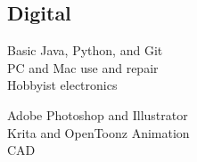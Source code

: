 \documentclass[a4paper]{deedy-resume} %
\begin{document}
    \begin{minipage}[t]{0.29\textwidth}
    
        \subsection{Digital}
        
            \textbullet{} Basic Java, Python, and Git \\
            \textbullet{} PC and Mac use and repair \\
            \textbullet{} Hobbyist electronics

            \textbullet{} Adobe Photoshop and Illustrator \\
            \textbullet{} Krita and OpenToonz Animation \\
            \textbullet{} CAD \\
        
    
    \end{minipage}

    
    \iffalse
    \begin{minipage}[t]{0.33\textwidth}
    \subsection{Outdoor}
    
    \location{Rock Climbing}
        \textbullet{} Rock Wall Employee lead 5.08 \\
        \textbullet{} Top rope 5.10\\
    
    \location{Backpacking}
        \textbullet{} 15+ yrs backcountry experience \\
        \textbullet{} Wilderness First Responder\\
    \location{Water Activities}
        \textbullet{} Lifeguard \\
        \textbullet{} Capable Sailor \\
        \textbullet{} kayaking/canoeing/rafting\\
    
    \end{minipage}
    \fi
    
    \sectionspace %
    
    
    
\end{document}
